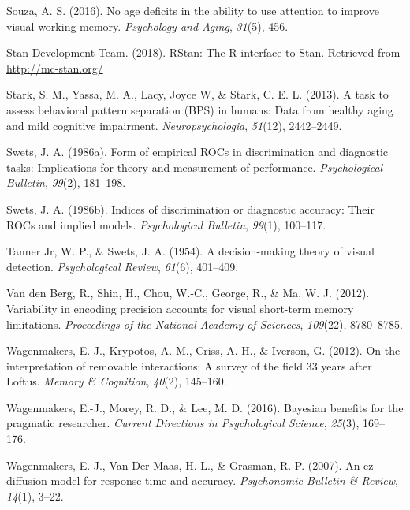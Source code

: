 \documentclass[
  english,
  ,man,floatsintext]{apa6}
\begin{document}
\leavevmode\hypertarget{ref-souza2016no}{}%
Souza, A. S. (2016). No age deficits in the ability to use attention to improve visual working memory. \emph{Psychology and Aging}, \emph{31}(5), 456.

\leavevmode\hypertarget{ref-rstan}{}%
Stan Development Team. (2018). RStan: The R interface to Stan. Retrieved from \url{http://mc-stan.org/}

\leavevmode\hypertarget{ref-StarkEtAl2013}{}%
Stark, S. M., Yassa, M. A., Lacy, Joyce W, \& Stark, C. E. L. (2013). A task to assess behavioral pattern separation (BPS) in humans: Data from healthy aging and mild cognitive impairment. \emph{Neuropsychologia}, \emph{51}(12), 2442--2449.

\leavevmode\hypertarget{ref-Swets1986b}{}%
Swets, J. A. (1986a). Form of empirical ROCs in discrimination and diagnostic tasks: Implications for theory and measurement of performance. \emph{Psychological Bulletin}, \emph{99}(2), 181--198.

\leavevmode\hypertarget{ref-Swets1986a}{}%
Swets, J. A. (1986b). Indices of discrimination or diagnostic accuracy: Their ROCs and implied models. \emph{Psychological Bulletin}, \emph{99}(1), 100--117.

\leavevmode\hypertarget{ref-TannerAndSwets1954}{}%
Tanner Jr, W. P., \& Swets, J. A. (1954). A decision-making theory of visual detection. \emph{Psychological Review}, \emph{61}(6), 401--409.

\leavevmode\hypertarget{ref-van2012variability}{}%
Van den Berg, R., Shin, H., Chou, W.-C., George, R., \& Ma, W. J. (2012). Variability in encoding precision accounts for visual short-term memory limitations. \emph{Proceedings of the National Academy of Sciences}, \emph{109}(22), 8780--8785.

\leavevmode\hypertarget{ref-WagenmakersEtAl2012}{}%
Wagenmakers, E.-J., Krypotos, A.-M., Criss, A. H., \& Iverson, G. (2012). On the interpretation of removable interactions: A survey of the field 33 years after Loftus. \emph{Memory \& Cognition}, \emph{40}(2), 145--160.

\leavevmode\hypertarget{ref-WagenmakersEtAl2016}{}%
Wagenmakers, E.-J., Morey, R. D., \& Lee, M. D. (2016). Bayesian benefits for the pragmatic researcher. \emph{Current Directions in Psychological Science}, \emph{25}(3), 169--176.

\leavevmode\hypertarget{ref-wagenmakers2007ez}{}%
Wagenmakers, E.-J., Van Der Maas, H. L., \& Grasman, R. P. (2007). An ez-diffusion model for response time and accuracy. \emph{Psychonomic Bulletin \& Review}, \emph{14}(1), 3--22.
\end{document}
